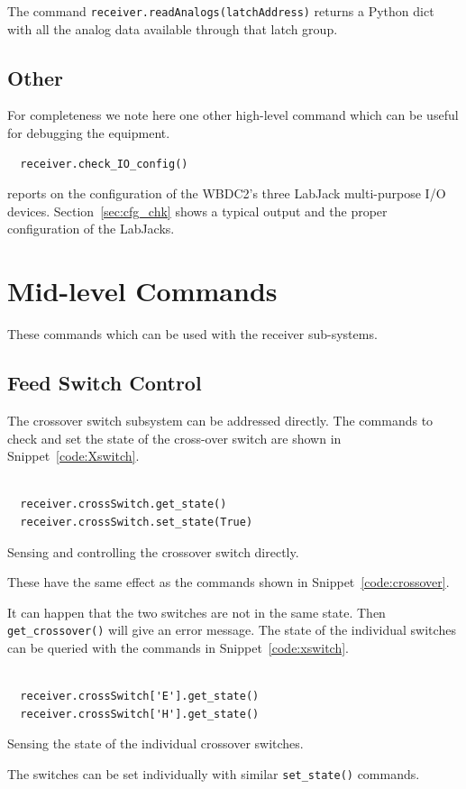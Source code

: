 \documentclass[letterpaper,11pt]{book}
\begin{document}
The command {\tt receiver.readAnalogs(latchAddress)} returns a Python dict with
all the analog data available through that latch group.

\subsection{Other}

For completeness we note here one other high-level command which can be useful
for debugging the equipment.
\begin{verbatim}
  receiver.check_IO_config()
\end{verbatim}
reports on the configuration of the WBDC2's three LabJack multi-purpose I/O
devices. Section~\ref{sec:cfg_chk} shows a typical output and the proper
configuration of the LabJacks.


\section{Mid-level Commands}

These commands which can be used with the receiver sub-systems.

\subsection{Feed Switch Control}

The crossover switch subsystem can be addressed directly.
The commands to check and set the state of the cross-over switch are shown in
Snippet~\ref{code:Xswitch}.
\begin{code}[h!tb]
\begin{center}
  \begin{verbatim}

  receiver.crossSwitch.get_state()
  receiver.crossSwitch.set_state(True)\end{verbatim}
  \caption{\label{code:Xswitch}Sensing and controlling the crossover switch
directly.}
\end{center}
\end{code}
These have the same effect as the commands shown in 
Snippet~\ref{code:crossover}.


It can happen that the two switches are not in the same state.  Then
{\tt get\_crossover()} will give an error message.  The state of the individual
switches can be queried with the commands in Snippet~\ref{code:xswitch}.
\begin{code}[h!tb]
\begin{center}
  \begin{verbatim}
  
  receiver.crossSwitch['E'].get_state()
  receiver.crossSwitch['H'].get_state()\end{verbatim}
  \caption{\label{code:xswitch}Sensing the state of the individual crossover
  switches.}
\end{center}
\end{code}
The switches can be set individually with similar {\tt set\_state()} commands.
\end{document}
